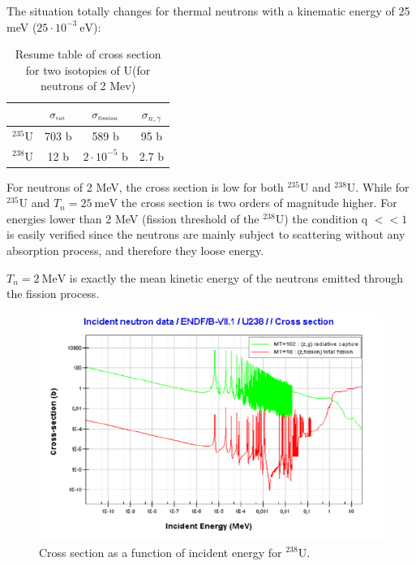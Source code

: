 The situation totally changes for thermal neutrons with a kinematic energy of 25 meV ($25 \cdot 10^{-3}~\mbox{eV}$):
\begin{table}[]
    \centering
    \begin{tabular}{|c|c|c|c|}
         \hline
         & $\sigma_{\tiny{\mbox{tot}}}$ & $\sigma_{\tiny{\mbox{fission}}}$ & $\sigma_{n,\gamma}$ \\
         \hline
        $^{235}\mbox{U}$ & 703 b & 589 b & 95 b \\
        \hline
        $^{238}\mbox{U}$ & 12 b & $2\cdot10^{-5}$ b & 2.7 b \\
        \hline
    \end{tabular}
    \caption{Resume table of cross section for two isotopies of U(for neutrons of 2 Mev)}
    \label{tab:nuclear-physics3-tab1}
\end{table}
For neutrons of 2 MeV, the cross section is low for both $^{235}\mbox{U}$ and $^{238}\mbox{U}$. While for $^{235}\mbox{U}$ and $T_{n} = 25~\mbox{meV}$ the cross section is two orders of magnitude higher.
For energies lower than 2 MeV (fission threshold of the $^{238}\mbox{U}$) the condition q $<< 1$ is easily verified since the neutrons are mainly subject to scattering without any absorption process, and therefore they loose energy.


$T_{n} = 2~\mbox{MeV}$ is exactly the mean kinetic energy of the neutrons emitted through the fission process. 
\begin{figure}
    \centering
    \includegraphics{Figures/nuclear-physics3-fig8.pdf}
    \caption{Cross section as a function of incident energy for $^{238}\mbox{U}$.}
    \label{fig:nuclear-physics-fig8}
\end{figure}

